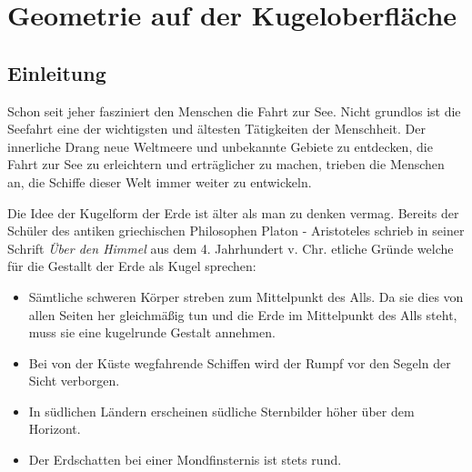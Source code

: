 \chapter{Geometrie auf der Kugeloberfläche\label{chapter:kugel}}
\begin{refsection}


\section{Einleitung}

Schon seit jeher fasziniert den Menschen die Fahrt zur See. Nicht grundlos ist die Seefahrt eine der wichtigsten und ältesten Tätigkeiten der Menschheit. Der innerliche Drang neue Weltmeere und unbekannte Gebiete zu entdecken, die Fahrt zur See zu erleichtern und erträglicher zu machen, trieben die Menschen an, die Schiffe dieser Welt immer weiter zu entwickeln.

Die Idee der Kugelform der Erde ist älter als man zu denken vermag. Bereits der Schüler des antiken griechischen Philosophen Platon - Aristoteles schrieb in seiner Schrift \textit{Über den Himmel} aus dem 4. Jahrhundert v. Chr. etliche Gründe welche für die Gestallt der Erde als Kugel sprechen:

\begin{itemize}
      \item Sämtliche schweren Körper streben zum Mittelpunkt des Alls. Da sie dies von allen Seiten her gleichmäßig tun und die Erde im Mittelpunkt des Alls steht, muss sie eine kugelrunde Gestalt annehmen. 
\item Bei von der Küste wegfahrende Schiffen wird der Rumpf vor den Segeln der Sicht verborgen. 
\item In südlichen Ländern erscheinen südliche Sternbilder höher über dem Horizont.
\item Der Erdschatten bei einer Mondfinsternis ist stets rund.
\end{itemize}


\end{refsection}
